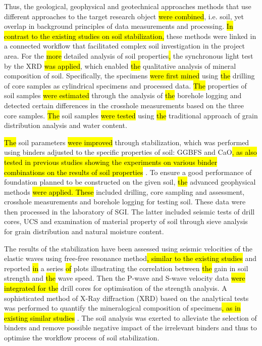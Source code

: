 \documentclass[USenglish,twocolumn]{article}
\begin{document}
Thus,\hl{ }the geological, geophysical and geotechnical approaches methods that use different approaches to the target research object \hl{were combined}, i.e. soil, yet overlap in background principles of data measurements and processing. \hl{In contrast to the existing studies on soil stabilization, }these methods were linked in a connected workflow that facilitated complex soil investigation in the project area. For the \hl{more }detailed analysis of soil properties\hl{, }the synchronous light test by the XRD \hl{was applied}, which enabled \hl{the }qualitative analysis of mineral composition of soil. Specifically,\hl{ }the specimens \hl{were first mined }using \hl{the }drilling of core samples as cylindrical specimens and processed data. \hl{The }properties of soil samples \hl{were estimated }through the analysis of \hl{the }borehole logging and detected certain differences in the crosshole measurements\hl{ }based on the three core samples. \hl{The }soil samples \hl{were tested }using \hl{the }traditional approach of grain distribution analysis and water content. 

\hl{The }soil parameters \hl{were improved }through stabilization, which was performed using binders adjusted to the specific properties of soil: GGBFS and CaO\hl{, as also tested in previous studies showing the experiments on various binder combinations on the results of soil properties }\cite{Lindh202232,Xu}. To ensure a good performance of foundation planned to be constructed on the given soil, \hl{the} advanced geophysical methods \hl{were applied. These} included drilling, core sampling and assessment, crosshole measurements and borehole logging for testing soil. These data were then processed in the laboratory of SGI. The latter included seismic tests of drill cores, UCS and examination of material property of soil through sieve analysis for grain distribution and natural moisture content.

The results of the stabilization have been assessed using seismic velocities of the elastic waves using free-free resonance method\hl{, similar to the existing studies} \cite{IsmailRyden} and reported\hl{ in }a series \hl{of} plots illustrating the correlation between \hl{the }gain in soil strength and \hl{the }wave speed. Then\hl{ }the P-wave and S-wave velocity data \hl{were integrated for the }drill cores for optimisation of the strength analysis. A sophisticated method of X-Ray diffraction (XRD) based on the analytical tests was performed to quantify the mineralogical composition of specimens\hl{, as in existing similar studies} \cite{Pires,Naik}. The soil analysis was exerted to alleviate the selection of binders and remove possible negative impact of the irrelevant binders and thus to optimise the workflow process of soil stabilization.
\end{document}
